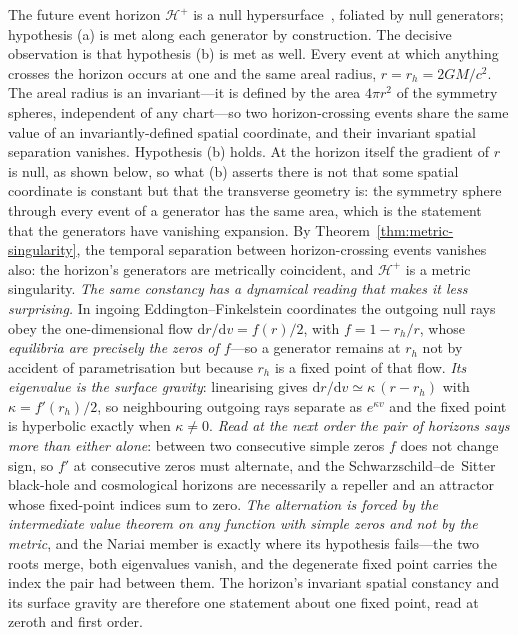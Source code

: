 \documentclass[11pt,a4paper]{article}
\theoremstyle{plain}
\theoremstyle{remark}
\newcommand{\dd}{\mathrm{d}}
\begin{document}
The future event horizon $\mathcal{H}^+$ is a null hypersurface~\cite{Hawking1973}, foliated by null generators; hypothesis (a) is met along each generator by construction. The decisive observation is that hypothesis (b) is met as well. Every event at which anything crosses the horizon occurs at one and the same areal radius, $r=r_h=2GM/c^2$. The areal radius is an invariant---it is defined by the area $4\pi r^2$ of the symmetry spheres, independent of any chart---so two horizon-crossing events share the same value of an invariantly-defined spatial coordinate, and their invariant spatial separation vanishes. Hypothesis (b) holds. At the horizon itself the gradient of $r$ is null, as shown below, so what (b) asserts there is not that some spatial coordinate is constant but that the transverse geometry is: the symmetry sphere through every event of a generator has the same area, which is the statement that the generators have vanishing expansion. By Theorem~\ref{thm:metric-singularity}, the temporal separation between horizon-crossing events vanishes also: the horizon's generators are metrically coincident, and $\mathcal{H}^+$ is a metric singularity. \emph{The same constancy has a dynamical reading that makes it less surprising.} In ingoing Eddington--Finkelstein coordinates the outgoing null rays obey the one-dimensional flow $\dd r/\dd v=f(r)/2$, with $f=1-r_h/r$, whose \emph{equilibria are precisely the zeros of $f$}---so a generator remains at $r_h$ not by accident of parametrisation but because $r_h$ is a fixed point of that flow. \emph{Its eigenvalue is the surface gravity}: linearising gives $\dd r/\dd v\simeq\kappa\,(r-r_h)$ with $\kappa=f'(r_h)/2$, so neighbouring outgoing rays separate as $e^{\kappa v}$ and the fixed point is hyperbolic exactly when $\kappa\neq0$. \emph{Read at the next order the pair of horizons says more than either alone}: between two consecutive simple zeros $f$ does not change sign, so $f'$ at consecutive zeros must alternate, and the Schwarzschild--de~Sitter black-hole and cosmological horizons are necessarily a repeller and an attractor whose fixed-point indices sum to zero. \emph{The alternation is forced by the intermediate value theorem on any function with simple zeros and not by the metric}, and the Nariai member is exactly where its hypothesis fails---the two roots merge, both eigenvalues vanish, and the degenerate fixed point carries the index the pair had between them. The horizon's invariant spatial constancy and its surface gravity are therefore one statement about one fixed point, read at zeroth and first order.
\end{document}
